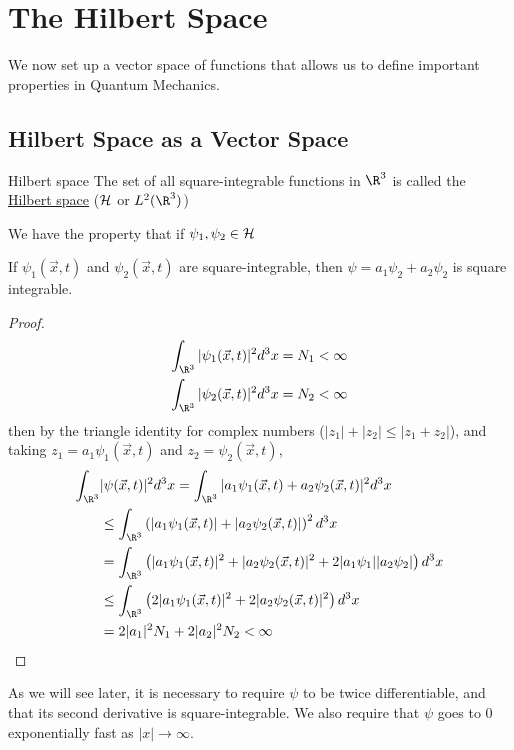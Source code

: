 \documentclass[../Main.tex]{subfiles}
\begin{document}
\section{The Hilbert Space}
We now set up a vector space of functions that allows us to define important properties in Quantum Mechanics.
\subsection{Hilbert Space as a Vector Space}
\begin{definition}{Hilbert space}
    The set of all square-integrable functions in $\R^3$ is called the \underline{Hilbert space} ($\mathcal{H}$ or $L^2(\R^3)$)
\end{definition}
We have the property that if $\psi_1, \psi_2 \in \mathcal{H}$

\begin{theorem}
    If $\psi_1(\vec{x}, t)$ and $\psi_2(\vec{x}, t)$ are square-integrable, then $\psi = a_1 \psi_2 + a_2 \psi_2$ is square integrable.
    \label{thmSuperposition}
\end{theorem}
\begin{proof}
    \begin{align*}
        \int_{\R^3} |\psi_1(\vec{x}, t)|^2 d^3x &= N_1 < \infty \\
        \int_{\R^3} |\psi_2(\vec{x}, t)|^2 d^3x &= N_2 < \infty 
    \end{align*}
    then by the triangle identity for complex numbers ($|z_1| + |z_2| \leq |z_1 + z_2|$), and taking $z_1 = a_1 \psi_1(\vec{x}, t)$ and $z_2 = \psi_2(\vec{x}, t)$,
    \begin{align*}
        \int_{\R^3}& |\psi(\vec{x}, t)|^2 d^3x = \int_{\R^3} |a_1 \psi_1(\vec{x}, t) + a_2 \psi_2 (\vec{x}, t)|^2 d^3x \\
        &\leq \int_{\R^3} \left(|a_1 \psi_1(\vec{x}, t)| + |a_2 \psi_2 (\vec{x}, t)|\right)^2 d^3x \\
        &= \int_{\R^3} \left(|a_1 \psi_1(\vec{x}, t)|^2 + |a_2 \psi_2 (\vec{x}, t)|^2+ 2 |a_1 \psi_1||a_2 \psi_2|\right) d^3x \\
        &\leq \int_{\R^3} \left(2|a_1 \psi_1(\vec{x}, t)|^2 + 2|a_2 \psi_2 (\vec{x}, t)|^2\right) d^3x \\
        &= 2|a_1|^2 N_1 + 2|a_2|^2 N_2 < \infty
    \end{align*}
\end{proof}
\begin{remark}
    As we will see later, it is necessary to require $\psi$ to be twice differentiable, and that its second derivative is square-integrable. We also require that $\psi$ goes to $0$ exponentially fast as $|x| \to \infty$.
\end{remark}
\end{document}

